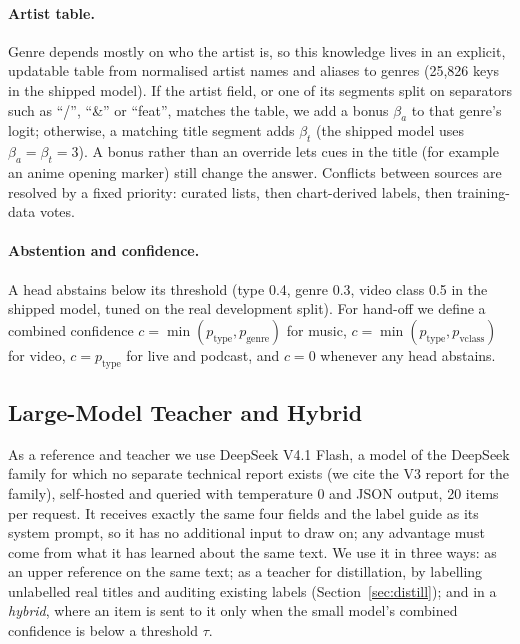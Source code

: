 \documentclass[11pt]{article}
\begin{document}
\paragraph{Artist table.} Genre depends mostly on who the artist is, so this knowledge lives in an explicit, updatable table from normalised artist names and aliases to genres (25,826 keys in the shipped model). If the artist field, or one of its segments split on separators such as ``/'', ``\&'' or ``feat'', matches the table, we add a bonus $\beta_a$ to that genre's logit; otherwise, a matching title segment adds $\beta_t$ (the shipped model uses $\beta_a = \beta_t = 3$). A bonus rather than an override lets cues in the title (for example an anime opening marker) still change the answer. Conflicts between sources are resolved by a fixed priority: curated lists, then chart-derived labels, then training-data votes.

\paragraph{Abstention and confidence.} A head abstains below its threshold (type 0.4, genre 0.3, video class 0.5 in the shipped model, tuned on the real development split). For hand-off we define a combined confidence $c = \min(p_\text{type}, p_\text{genre})$ for music, $c = \min(p_\text{type}, p_\text{vclass})$ for video, $c = p_\text{type}$ for live and podcast, and $c = 0$ whenever any head abstains.

\subsection{Large-Model Teacher and Hybrid}
\label{sec:hybrid}

As a reference and teacher we use DeepSeek V4.1 Flash, a model of the DeepSeek family for which no separate technical report exists (we cite the V3 report \citep{deepseekai2024deepseekv3} for the family), self-hosted and queried with temperature 0 and JSON output, 20 items per request. It receives exactly the same four fields and the label guide as its system prompt, so it has no additional input to draw on; any advantage must come from what it has learned about the same text. We use it in three ways: as an upper reference on the same text; as a teacher for distillation, by labelling unlabelled real titles and auditing existing labels (Section~\ref{sec:distill}); and in a \emph{hybrid}, where an item is sent to it only when the small model's combined confidence is below a threshold $\tau$.
\end{document}
